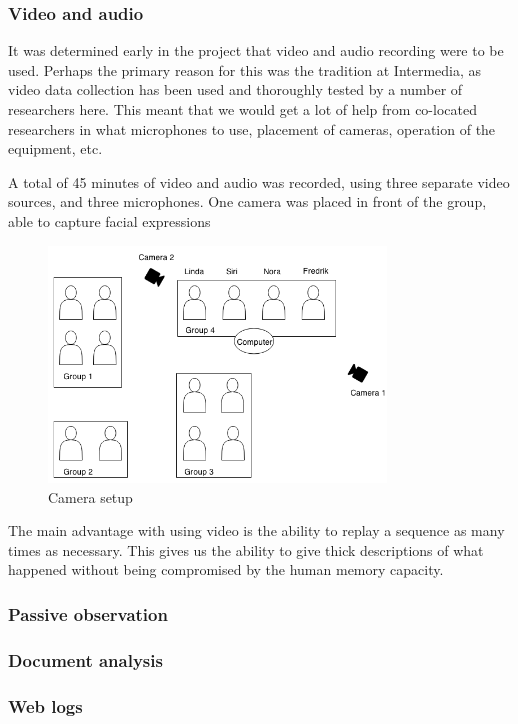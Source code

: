 \subsubsection{Video and audio}
It was determined early in the project that video and audio recording were to be used. Perhaps the primary reason for this was the tradition at Intermedia, as video data collection has been used and thoroughly tested by a number of researchers here. This meant that we would get a lot of help from co-located researchers in what microphones to use, placement of cameras, operation of the equipment, etc. 

A total of 45 minutes of video and audio was recorded, using three separate video sources, and three microphones. One camera was placed in front of the group, able to capture facial expressions
\begin{figure}
\centering
\includegraphics[width=0.8\textwidth]{img/empiricalsetting/class_diagram.png}
\caption{Camera setup}
\label{fig:camerasetup}
\end{figure}

The main advantage with using video is the ability to replay a sequence as many times as necessary. This gives us the ability to give thick descriptions of what happened without being compromised by the human memory capacity.

\subsubsection{Passive observation}

\subsubsection{Document analysis}

\subsubsection{Web logs}

